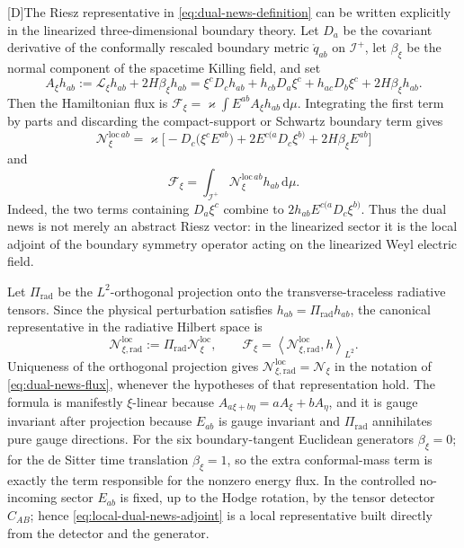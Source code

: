 \documentclass[11pt,a4paper]{article}
\newcommand{\scri}{\mathscr{I}}
\newcommand{\diff}{\mathrm{d}}
\newcommand{\statusD}{\textsf{[D]}}
\begin{document}
\statusD The Riesz representative in \eqref{eq:dual-news-definition} can be written explicitly in the linearized three-dimensional boundary theory.  Let \(D_a\) be the covariant derivative of the conformally rescaled boundary metric \(\mathring q_{ab}\) on \(\scri^+\), let \(\beta_\xi\) be the normal component of the spacetime Killing field, and set
\begin{equation}\label{eq:boundary-symmetry-operator}
  A_\xi h_{ab}
  :=
  \mathcal L_\xi h_{ab}+2H\beta_\xi h_{ab}
  =
  \xi^cD_ch_{ab}
  +
  h_{cb}D_a\xi^c
  +
  h_{ac}D_b\xi^c
  +
  2H\beta_\xi h_{ab} .
\end{equation}
Then the Hamiltonian flux is \(\mathcal F_\xi=\varkappa\int E^{ab}A_\xi h_{ab}\,\diff\mu\).  Integrating the first term by parts and discarding the compact-support or Schwartz boundary term gives
\begin{equation}\label{eq:local-dual-news-adjoint}
  \boxed{
    \mathscr N_\xi^{\mathrm{loc}\,ab}
    =
    \varkappa
    \Big[
      -
      D_c\big(\xi^c E^{ab}\big)
      +
      2E^{c(a}D_c\xi^{b)}
      +
      2H\beta_\xi E^{ab}
    \Big]
  }
\end{equation}
and
\begin{equation}\label{eq:local-dual-news-pairing}
  \mathcal F_\xi
  =
  \int_{\scri^+}
  \mathscr N_\xi^{\mathrm{loc}\,ab}h_{ab}\,\diff\mu .
\end{equation}
Indeed, the two terms containing \(D_a\xi^c\) combine to \(2h_{ab}E^{c(a}D_c\xi^{b)}\).  Thus the dual news is not merely an abstract Riesz vector: in the linearized sector it is the local adjoint of the boundary symmetry operator acting on the linearized Weyl electric field.

Let \(\Pi_{\mathrm{rad}}\) be the \(L^2\)-orthogonal projection onto the transverse-traceless radiative tensors.  Since the physical perturbation satisfies \(h_{ab}=\Pi_{\mathrm{rad}}h_{ab}\), the canonical representative in the radiative Hilbert space is
\begin{equation}\label{eq:local-dual-news-radical}
  \mathscr N_{\xi,\mathrm{rad}}^{\mathrm{loc}}
  :=
  \Pi_{\mathrm{rad}}\mathscr N_\xi^{\mathrm{loc}},
  \qquad
  \mathcal F_\xi
  =
  \left\langle
    \mathscr N_{\xi,\mathrm{rad}}^{\mathrm{loc}},h
  \right\rangle_{L^2} .
\end{equation}
Uniqueness of the orthogonal projection gives
\(\mathscr N_{\xi,\mathrm{rad}}^{\mathrm{loc}}=\mathscr N_\xi\) in the notation of \eqref{eq:dual-news-flux}, whenever the hypotheses of that representation hold.  The formula is manifestly \(\xi\)-linear because \(A_{a\xi+b\eta}=aA_\xi+bA_\eta\), and it is gauge invariant after projection because \(E_{ab}\) is gauge invariant and \(\Pi_{\mathrm{rad}}\) annihilates pure gauge directions.  For the six boundary-tangent Euclidean generators \(\beta_\xi=0\); for the de Sitter time translation \(\beta_\xi=1\), so the extra conformal-mass term is exactly the term responsible for the nonzero energy flux.  In the controlled no-incoming sector \(E_{ab}\) is fixed, up to the Hodge rotation, by the tensor detector \(\hat C_{AB}\); hence \eqref{eq:local-dual-news-adjoint} is a local representative built directly from the detector and the generator.
\end{document}
